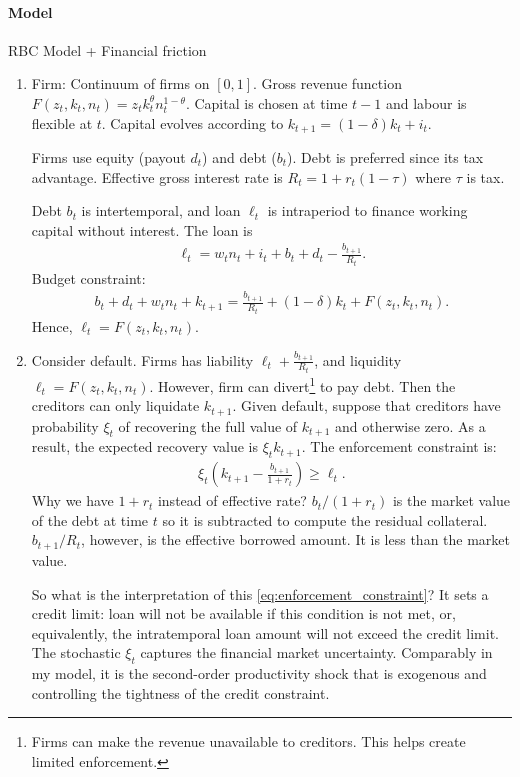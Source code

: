 \documentclass[12pt]{article}
\numberwithin{equation}{section}
\begin{document}
\paragraph{Model} RBC Model + Financial friction
\begin{enumerate}
	\item Firm: Continuum of firms on $[0,1]$. Gross revenue function $F(z_t, k_t, n_t) = z_t k_t^{\theta} n_t^{1-\theta}$. Capital is chosen at time $t-1$ and labour is flexible at $t$. Capital evolves according to $k_{t+1} = (1-\delta) k_t + i_t$.
	
	Firms use equity (payout $d_t$) and debt ($b_t$). Debt is preferred since its tax advantage. Effective gross interest rate is $R_t = 1+ r_t(1-\tau)$ where $\tau$ is tax.

	Debt $b_t$ is intertemporal, and loan $\ell_t$ is intraperiod to finance working capital without interest.
	The loan is
	\begin{align*}
		\ell_t = w_t n_t + i_t + b_t + d_t - \frac{b_{t+1}}{R_t}.
	\end{align*}
	Budget constraint:
	\begin{align*}
		b_t + d_t + w_t n_t + k_{t+1} = \frac{b_{t+1}}{R_t} + (1-\delta)k_t + F(z_t, k_t, n_t).
	\end{align*}
	Hence, $\ell_t = F(z_t, k_t, n_t)$.

	\item Consider default. Firms has liability $\ell_t + \frac{b_{t+1}}{R_t}$, and liquidity $\ell_t = F(z_t, k_t, n_t)$. However, firm can divert\footnote{Firms can make the revenue unavailable to creditors. This helps create limited enforcement.} to pay debt. Then the creditors can only liquidate $k_{t+1}$. Given default, suppose that creditors have probability $\xi_t$ of recovering the full value of $k_{t+1}$ and otherwise zero. As a result, the expected recovery value is $\xi_t k_{t+1}$. The enforcement constraint is:
	\begin{align}\label{eq:enforcement_constraint}
		\xi_t \left(k_{t+1} - \frac{b_{t+1}}{1+r_t}\right) \geq \ell_t.
	\end{align}
	Why we have $1+r_t$ instead of effective rate? $b_t/(1+r_t)$ is the market value of the debt at time $t$ so it is subtracted to compute the residual collateral. $b_{t+1}/R_t$, however, is the effective borrowed amount. It is less than the market value. 

	So what is the interpretation of this \eqref{eq:enforcement_constraint}? It sets a credit limit: loan will not be available if this condition is not met, or, equivalently, the intratemporal loan amount will not exceed the credit limit. The stochastic $\xi_t$ captures the financial market uncertainty. Comparably in my model, it is the second-order productivity shock that is exogenous and controlling the tightness of the credit constraint.


\end{enumerate}
\end{document}
